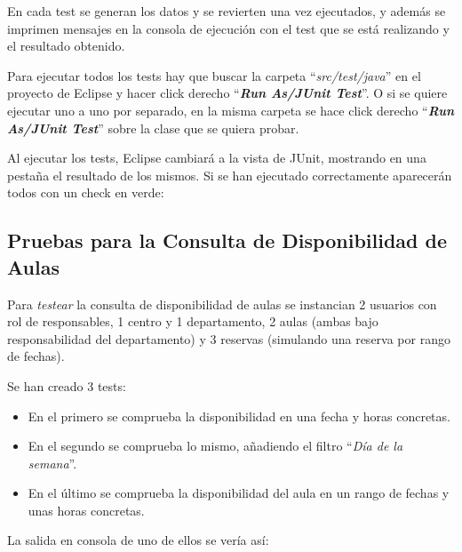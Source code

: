 En cada test se generan los datos y se revierten una vez ejecutados, y además se imprimen mensajes en la consola de ejecución con el test que se está realizando y el resultado obtenido.

Para ejecutar todos los tests hay que buscar la carpeta ``\textit{src/test/java}'' en el proyecto de Eclipse y hacer click derecho ``\textbf{\textit{Run As/JUnit Test}}''. O si se quiere ejecutar uno a uno por separado, en la misma carpeta se hace click derecho ``\textbf{\textit{Run As/JUnit Test}}'' sobre la clase que se quiera probar.


Al ejecutar los tests, Eclipse cambiará a la vista de JUnit, mostrando en una pestaña el resultado de los mismos. Si se han ejecutado correctamente aparecerán todos con un check en verde:


\subsection{Pruebas para la Consulta de Disponibilidad de Aulas}
Para \textit{testear} la consulta de disponibilidad de aulas se instancian 2 usuarios con rol de responsables, 1 centro y 1 departamento, 2 aulas (ambas bajo responsabilidad del departamento) y 3 reservas (simulando una reserva por rango de fechas).

Se han creado 3 tests:
\begin{itemize}
    \item En el primero se comprueba la disponibilidad en una fecha y horas concretas.
    \item En el segundo se comprueba lo mismo, añadiendo el filtro ``\textit{Día de la semana}''.
    \item En el último se comprueba la disponibilidad del aula en un rango de fechas y unas horas concretas.
\end{itemize}


La salida en consola de uno de ellos se vería así:


